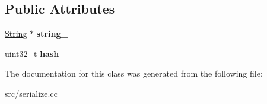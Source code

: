 \subsection*{Public Attributes}
\begin{DoxyCompactItemize}
\item 
\hypertarget{classv8_1_1internal_1_1_string_table_insertion_key_a1668153ba231ce255889e0ba8393b73d}{}\hyperlink{classv8_1_1internal_1_1_string}{String} $\ast$ {\bfseries string\+\_\+}\label{classv8_1_1internal_1_1_string_table_insertion_key_a1668153ba231ce255889e0ba8393b73d}

\item 
\hypertarget{classv8_1_1internal_1_1_string_table_insertion_key_ae2c0ab84c09b4126990a83da8495a8a6}{}uint32\+\_\+t {\bfseries hash\+\_\+}\label{classv8_1_1internal_1_1_string_table_insertion_key_ae2c0ab84c09b4126990a83da8495a8a6}

\end{DoxyCompactItemize}


The documentation for this class was generated from the following file\+:\begin{DoxyCompactItemize}
\item 
src/serialize.\+cc\end{DoxyCompactItemize}
